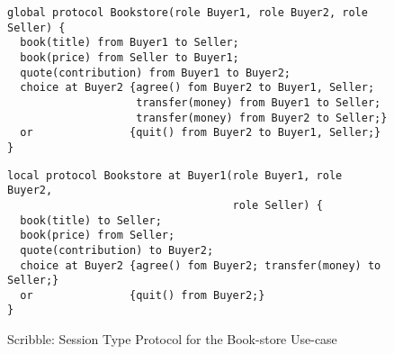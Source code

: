 \begin{figure}[t]
\begin{lstlisting}
global protocol Bookstore(role Buyer1, role Buyer2, role Seller) {
  book(title) from Buyer1 to Seller;
  book(price) from Seller to Buyer1;
  quote(contribution) from Buyer1 to Buyer2;
  choice at Buyer2 {agree() fom Buyer2 to Buyer1, Seller;
                    transfer(money) from Buyer1 to Seller;
                    transfer(money) from Buyer2 to Seller;}
  or               {quit() from Buyer2 to Buyer1, Seller;}
}
\end{lstlisting}


\begin{lstlisting}
local protocol Bookstore at Buyer1(role Buyer1, role Buyer2,
                                   role Seller) {
  book(title) to Seller;
  book(price) from Seller;
  quote(contribution) to Buyer2;
  choice at Buyer2 {agree() fom Buyer2; transfer(money) to Seller;}
  or               {quit() from Buyer2;}
}
\end{lstlisting}

\caption{Scribble: Session Type Protocol for the Book-store Use-case}
\label{fig:scribble_bs}
\end{figure}
